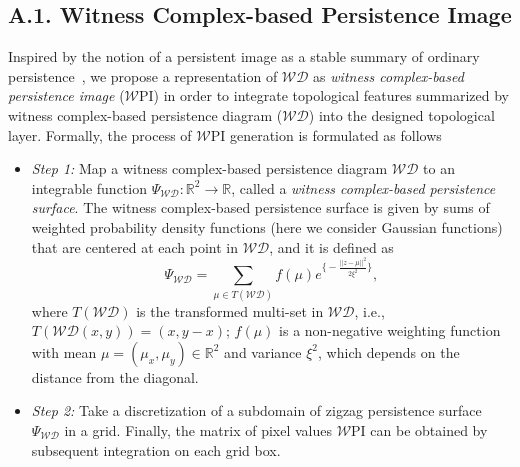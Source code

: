 \documentclass[letterpaper]{article} %
\begin{document}
\subsection{A.1. Witness Complex-based Persistence Image}
Inspired by the notion of a persistent image as a stable summary of ordinary persistence~\cite{adams2017persistence}, we propose a representation of $\mathcal{WD}$ as {\it witness complex-based persistence image} ($\mathcal{W}\text{PI}$) in order to integrate topological features summarized by witness complex-based persistence diagram ($\mathcal{WD}$) into the designed topological layer. Formally, the process of $\mathcal{W}\text{PI}$ generation is formulated as follows
\begin{itemize}[leftmargin=*]
\item\textit{Step 1:} Map a witness complex-based persistence diagram $\mathcal{WD}$ to an integrable function $\Psi_{\mathcal{WD}}: \mathbb{R}^2 \rightarrow \mathbb{R}$, called a {\it witness complex-based persistence surface}. The witness complex-based persistence surface is given by sums of weighted probability density functions (here we consider Gaussian functions) that are centered at each point in $\mathcal{WD}$, and it is defined as
$$\Psi_{\mathcal{WD}} = \sum_{\mu \in T(\mathcal{WD})}f\left(\mu\right)e^{\bigl\{-\frac{{||z-\mu||^2}}{{2\xi^2}}\bigr\}},$$
where $T(\mathcal{WD})$ is the transformed multi-set in $\mathcal{WD}$, i.e., $T(\mathcal{WD} (x,y)) = (x,y-x)$; $f(\mu)$ is a non-negative weighting function with mean $\mu = (\mu_x, \mu_y) \in \mathbb{R}^2$ and variance $\xi^2$, which depends on the distance from the diagonal.

\item \textit{Step 2:} Take a discretization %
 of a subdomain of zigzag persistence surface $\Psi_{\mathcal{WD}}$ in a grid. Finally, the matrix of pixel values $\mathcal{W}\text{PI}$ can be obtained by subsequent integration on each grid box.
\end{itemize}
\end{document}
